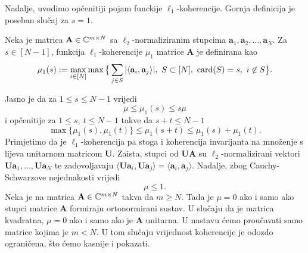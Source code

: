 \documentclass[a4paper,twoside,12pt]{memoir} %
\newcommand{\vect}[1]{\mathbf{#1}}
\renewcommand{\vec}{\vect}
\newcommand{\card}{\text{\normalfont{card}}}
\begin{document}
Nadalje, uvodimo op\v{c}enitiji pojam funckije $\ell_1$-koherencije. Gornja definicija je poseban slu\v{c}aj za $s = 1$.
\begin{defn}
    Neka je matrica $\vec A \in \C^{m \times N}$ sa $\ell_2$-normaliziranim stupcima  $\vec a_1, \vec a_2, \dots, \vec a_N$. Za $s \in [N-1]$, funkcija $\ell_1$-koherencije $\mu_1$ matrice $\vec A$ je definirana kao
    \begin{equation*}
        \mu_1(s) := \max_{i \in [N]} \max \big\{ \sum_{j \in S} |\langle \vec a_i, \vec a_j \rangle|,\ S \subset [N],\ \card(S) = s,\ i \not \in S   \big\} .
    \end{equation*}
\end{defn}
Jasno je da za $1 \leq s \leq N-1$ vrijedi
\begin{equation}\label{5:2}
    \mu \leq \mu_1(s) \leq s \mu
\end{equation}
i op\v{c}enitije za $1 \leq s,\ t \leq N-1$ takve da $s+t \leq N-1$
\begin{equation}\label{5:3}
    \max \{\mu_1(s), \mu_1(t)\}  \leq \mu_1(s+t) \leq \mu_1(s) + \mu_1(t).
\end{equation}
Primjetimo da je $\ell_1$-koherencija pa stoga i koherencija invarijanta na mno\v{z}enje s lijeva unitarnom matricom $\vec U$. Zaista, stupci od $\vec{UA}$ su $\ell_2$-normalizirani vektori $\vec{Ua}_1, \dots, \vec{Ua}_N$ te zadovoljavaju $\langle \vec{Ua}_i, \vec{Ua}_j \rangle = \langle \vec a_i , \vec a_j \rangle$. Nadalje, zbog Cauchy-Schwarzove nejednakosti vrijedi
\begin{equation*}
   \mu \leq 1. 
\end{equation*}
Neka je na matrica $\vec A \in \C^{m \times N}$ takva da $m \geq N$. Tada je $\mu = 0$ ako i samo ako stupci matrice $\vec A$ formiraju ortonormirani sustav. U slu\v{c}aju da je matrica kvadratna, $\mu = 0$ ako i samo ako je $\vec A$ unitarna. U nastavu \'cemo prou\v{c}avati samo matrice kojima je $m < N$. U tom slu\v{c}aju vrijednost koherencije je odozdo ograni\v{c}ena, \v{s}to \'cemo kasnije i pokazati. 
\end{document}
